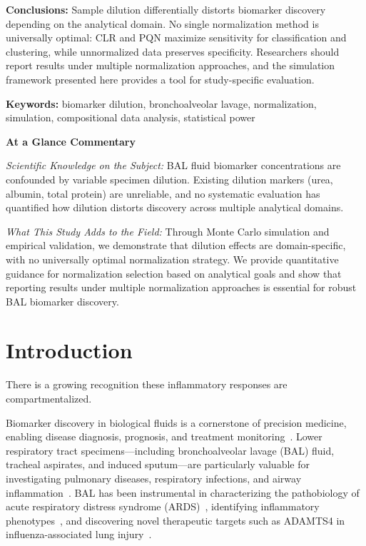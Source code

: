 \documentclass[12pt]{article}
\begin{document}
\textbf{Conclusions:} Sample dilution differentially distorts biomarker discovery depending on the analytical domain. No single normalization method is universally optimal: CLR and PQN maximize sensitivity for classification and clustering, while unnormalized data preserves specificity. Researchers should report results under multiple normalization approaches, and the simulation framework presented here provides a tool for study-specific evaluation.

\textbf{Keywords:} biomarker dilution, bronchoalveolar lavage, normalization, simulation, compositional data analysis, statistical power

\vspace{0.5cm}
\noindent\textbf{At a Glance Commentary}

\noindent\textit{Scientific Knowledge on the Subject:} BAL fluid biomarker concentrations are confounded by variable specimen dilution. Existing dilution markers (urea, albumin, total protein) are unreliable, and no systematic evaluation has quantified how dilution distorts discovery across multiple analytical domains.

\noindent\textit{What This Study Adds to the Field:} Through Monte Carlo simulation and empirical validation, we demonstrate that dilution effects are domain-specific, with no universally optimal normalization strategy. We provide quantitative guidance for normalization selection based on analytical goals and show that reporting results under multiple normalization approaches is essential for robust BAL biomarker discovery.

\newpage

\section{Introduction}
\setlength{\parindent}{0.5in}

There is a growing recognition these inflammatory responses are compartmentalized. 

Biomarker discovery in biological fluids is a cornerstone of precision medicine, enabling disease diagnosis, prognosis, and treatment monitoring~\cite{Biomarkers2001,Califf2018}. Lower respiratory tract specimens---including bronchoalveolar lavage (BAL) fluid, tracheal aspirates, and induced sputum---are particularly valuable for investigating pulmonary diseases, respiratory infections, and airway inflammation~\cite{Meyer2007,Meyer2012,Haslam1999}. BAL has been instrumental in characterizing the pathobiology of acute respiratory distress syndrome (ARDS)~\cite{Matthay2019,Ware2013}, identifying inflammatory phenotypes~\cite{Calfee2014}, and discovering novel therapeutic targets such as ADAMTS4 in influenza-associated lung injury~\cite{Boyd2020}.
\end{document}
